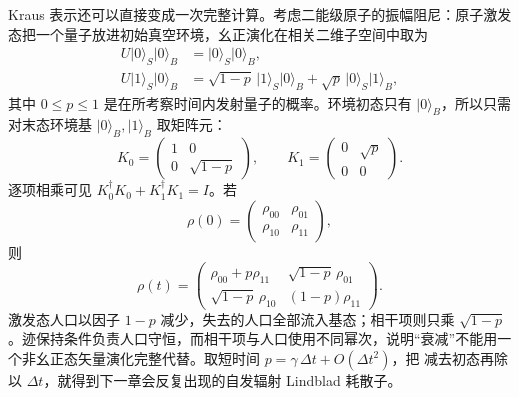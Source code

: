 Kraus 表示还可以直接变成一次完整计算。考虑二能级原子的振幅阻尼：原子激发态把一个量子放进初始真空环境，幺正演化在相关二维子空间中取为
\[
\begin{aligned}
U\lvert0\rangle_S\lvert0\rangle_B
&=\lvert0\rangle_S\lvert0\rangle_B,\\
U\lvert1\rangle_S\lvert0\rangle_B
&=\sqrt{1-p}\,\lvert1\rangle_S\lvert0\rangle_B
+\sqrt p\,\lvert0\rangle_S\lvert1\rangle_B,
\end{aligned}
\]
其中 \(0\leq p\leq1\) 是在所考察时间内发射量子的概率。环境初态只有
\(\lvert0\rangle_B\)，所以只需对末态环境基
\(\lvert0\rangle_B,\lvert1\rangle_B\) 取矩阵元：
\begin{equation}
K_0=\begin{pmatrix}1&0\\0&\sqrt{1-p}\end{pmatrix},
\qquad
K_1=\begin{pmatrix}0&\sqrt p\\0&0\end{pmatrix}.
\label{eq:oqs-amplitude-damping-kraus}
\end{equation}
逐项相乘可见
\(K_0^\dagger K_0+K_1^\dagger K_1=I\)。若
\[
\rho(0)=\begin{pmatrix}
\rho_{00}&\rho_{01}\\
\rho_{10}&\rho_{11}
\end{pmatrix},
\]
则
\begin{equation}
\rho(t)=
\begin{pmatrix}
\rho_{00}+p\rho_{11}&\sqrt{1-p}\,\rho_{01}\\
\sqrt{1-p}\,\rho_{10}&(1-p)\rho_{11}
\end{pmatrix}.
\label{eq:oqs-amplitude-damping-map}
\end{equation}
激发态人口以因子 \(1-p\) 减少，失去的人口全部流入基态；相干项则只乘 \(\sqrt{1-p}\)。迹保持条件负责人口守恒，而相干项与人口使用不同幂次，说明“衰减”不能用一个非幺正态矢量演化完整代替。取短时间
\(p=\gamma\,\Delta t+O(\Delta t^2)\)，把
减去初态再除以 \(\Delta t\)，就得到下一章会反复出现的自发辐射 Lindblad 耗散子。

